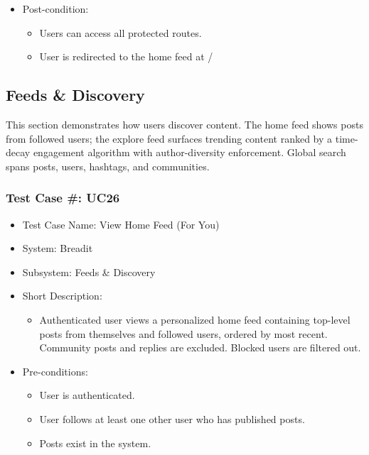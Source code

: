 \begin{itemize}
  \item Post-condition:
\begin{itemize}
  \item Users can access all protected routes.
  \item User is redirected to the home feed at /
\end{itemize}
\end{itemize}

\subsection{Feeds \& Discovery}

This section demonstrates how users discover content. The home feed shows posts from followed users; the explore feed surfaces trending content ranked by a time-decay engagement algorithm with author-diversity enforcement. Global search spans posts, users, hashtags, and communities.

\subsubsection{Test Case \#: UC26}
\begin{itemize}
  \item Test Case Name: View Home Feed (For You)
  \item System: Breadit
  \item Subsystem: Feeds \& Discovery
  \item Short Description:
\begin{itemize}
  \item Authenticated user views a personalized home feed containing top-level posts from themselves and followed users, ordered by most recent. Community posts and replies are excluded. Blocked users are filtered out.
\end{itemize}
  \item Pre-conditions:
\begin{itemize}
  \item User is authenticated.
  \item User follows at least one other user who has published posts.
  \item Posts exist in the system.
\end{itemize}
\end{itemize}

